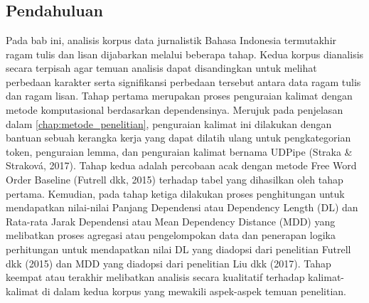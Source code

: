 \chapter{\babEmpat} \label{chap:analisis}
\section{Pendahuluan}
Pada bab ini, analisis korpus data jurnalistik Bahasa Indonesia termutakhir ragam tulis dan lisan dijabarkan melalui beberapa tahap. Kedua korpus dianalisis secara terpisah agar temuan analisis dapat disandingkan untuk melihat perbedaan karakter serta signifikansi perbedaan tersebut antara data ragam tulis dan ragam lisan. Tahap pertama merupakan proses penguraian kalimat dengan metode komputasional berdasarkan dependensinya. Merujuk pada penjelasan dalam \autoref{chap:metode_penelitian}, penguraian kalimat ini dilakukan dengan bantuan sebuah kerangka kerja yang dapat dilatih ulang untuk pengkategorian token, penguraian lemma, dan penguraian kalimat bernama UDPipe (Straka & Straková, 2017). Tahap kedua adalah percobaan acak dengan metode Free Word Order Baseline (Futrell dkk, 2015) terhadap tabel yang dihasilkan oleh tahap pertama. Kemudian, pada tahap ketiga dilakukan proses penghitungan untuk mendapatkan nilai-nilai Panjang Dependensi atau Dependency Length  (DL) dan Rata-rata Jarak Dependensi atau Mean Dependency Distance (MDD) yang melibatkan proses agregasi atau pengelompokan data dan penerapan logika perhitungan untuk mendapatkan nilai DL yang diadopsi dari penelitian Futrell dkk (2015) dan MDD yang diadopsi dari penelitian Liu dkk (2017). Tahap keempat atau terakhir melibatkan analisis secara kualitatif terhadap kalimat-kalimat di dalam kedua korpus yang mewakili aspek-aspek temuan penelitian.

